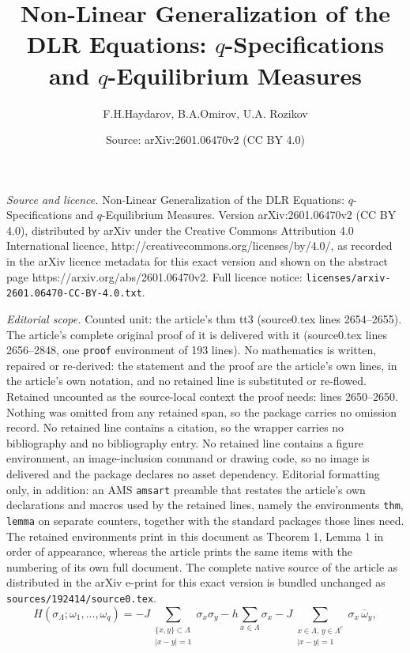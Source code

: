 \documentclass[10pt,a4paper]{amsart}
\title{Non-Linear Generalization of the DLR Equations: $q$-Specifications and $q$-Equilibrium Measures}
\author{F.H.Haydarov, B.A.Omirov, U.A. Rozikov}
\date{Source: arXiv:2601.06470v2 (CC BY 4.0)}
\begin{document}
\maketitle

\noindent\emph{Source and licence.} Non-Linear Generalization of the DLR Equations: $q$-Specifications and $q$-Equilibrium Measures. Version arXiv:2601.06470v2 (CC BY 4.0), distributed by arXiv under the Creative Commons Attribution 4.0 International licence, http://creativecommons.org/licenses/by/4.0/, as recorded in the arXiv licence metadata for this exact version and shown on the abstract page https://arxiv.org/abs/2601.06470v2. Full licence notice: \texttt{licenses/arxiv-2601.06470-CC-BY-4.0.txt}.\par\smallskip

\noindent\textit{Editorial scope.} Counted unit: the article's thm tt3 (source0.tex lines 2654--2655). The article's complete original proof of it is delivered with it (source0.tex lines 2656--2848, one \texttt{proof} environment of 193 lines). No mathematics is written, repaired or re-derived: the statement and the proof are the article's own lines, in the article's own notation, and no retained line is substituted or re-flowed.  Retained uncounted as the source-local context the proof needs: lines 2650--2650.  Nothing was omitted from any retained span, so the package carries no omission record.  No retained line contains a citation, so the wrapper carries no bibliography and no bibliography entry.  No retained line contains a figure environment, an image-inclusion command or drawing code, so no image is delivered and the package declares no asset dependency.  Editorial formatting only, in addition: an AMS \texttt{amsart} preamble that restates the article's own declarations and macros used by the retained lines, namely the environments \texttt{thm}, \texttt{lemma} on separate counters, together with the standard packages those lines need.  The retained environments print in this document as Theorem 1, Lemma 1 in order of appearance, whereas the article prints the same items with the numbering of its own full document.  The complete native source of the article as distributed in the arXiv e-print for this exact version is bundled unchanged as \texttt{sources/192414/source0.tex}.
\begin{equation}\label{1dh}  H(\sigma_\Lambda; \omega_1, \dots, \omega_q) = -J \sum_{\substack{\{x,y\} \subset \Lambda \\ |x-y|=1}} \sigma_x \sigma_y - h \sum_{x \in \Lambda} \sigma_x - J \sum_{\substack{x \in \Lambda,\, y \in \Lambda^c \\ |x-y|=1}} \sigma_x \, \overline{\omega}_y, \end{equation}
\end{document}
